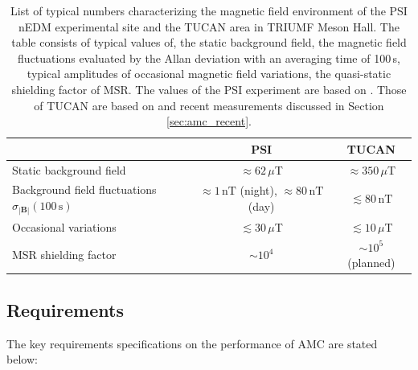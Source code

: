 \begin{table}[tb!]
\centering 
\begin{tabular}{|l||c|c|}
\hline

 & \multicolumn{1}{c|}{\textbf{PSI}} & \multicolumn{1}{c|}{\textbf{TUCAN}} \\ \hline\hline 
Static background field & $\approx62\,\mu$T & $\approx 350\,\mu$T            \\ \hline
Background field fluctuations $\sigma_{|\mathbf{B}|}(100\,\mathrm{s})$ & $\approx 1\,\mathrm{nT}$ (night), $\approx 80\,\mathrm{nT}$ (day) & $\lesssim 80\,\mathrm{nT}$ \\ \hline
Occasional variations  & $\lesssim30\,\mu$T  & $\lesssim 10\,\mu$T      \\ \hline
 MSR shielding factor    &  $\sim 10^4$  &  $\sim 10^5$ (planned) \\ \hline 
\end{tabular}
\caption{List of typical numbers characterizing the magnetic field environment of the PSI nEDM experimental site and the TUCAN area in TRIUMF Meson Hall. The table consists of typical values of, the static background field, the magnetic field fluctuations evaluated by the Allan deviation with an averaging time of 100\,s, typical amplitudes of occasional magnetic field variations, the quasi-static shielding factor of MSR. The values of the PSI experiment are based on \cite{Afach2014,Fra:phd,baker2014apparatus}. Those of TUCAN are based on \cite{Sarte2013} and recent measurements discussed in Section \ref{sec:amc_recent}. 
}
\label{tab:amc_comparaion}
\end{table}


\subsection{Requirements}
The key requirements specifications on the performance of AMC are stated below:

